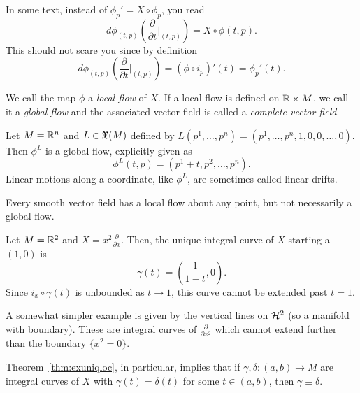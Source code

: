 \begin{remark}
	In some text, instead of $\phi_p' = X\circ\phi_p$, you read
	\begin{equation}
		d\phi_{(t,p)}\left(\frac{\partial}{\partial t}\Big|_{(t,p)}\right) = X \circ \phi(t,p).
	\end{equation}
	This should not scare you since by definition
	\begin{equation}
		d\phi_{(t,p)}\left(\frac{\partial}{\partial t}\Big|_{(t,p)}\right) = (\phi \circ i_p)'(t) = \phi_p'(t).
	\end{equation}
\end{remark}

We call the map $\phi$ a \emph{local flow} of $X$.
If a local flow is defined on $\mathbb{R}\times M$, we call it a \emph{global flow} and the associated vector field is called a \emph{complete vector field}.

\begin{example}\label{example:lineardrift}
	Let $M=\mathbb{R}^n$ and $L\in\mathfrak{X}(M)$ defined by $L(p^1, \ldots, p^n) = (p^1, \ldots, p^n, 1, 0, 0, \ldots, 0)$.
	Then $\phi^L$ is a global flow, explicitly given as
	\begin{equation}
		\phi^L(t,p) = (p^1+t, p^2, \ldots, p^n).
	\end{equation}
	Linear motions along a coordinate, like $\phi^L$, are sometimes called linear drifts.
\end{example}

Every smooth vector field has a local flow about any point, but not necessarily a global flow.
\begin{example}\label{ex:non-complete}
	Let $M = \mathbb{R}^2$ and $X = x^2 \frac{\partial}{\partial x}$.
	Then, the unique integral curve of $X$ starting a $(1,0)$ is
	\begin{equation}
		\gamma(t) = \left(\frac{1}{1-t}, 0\right).
	\end{equation}
	Since $i_x \circ \gamma(t)$ is unbounded as $t\to 1$, this curve cannot be extended past $t=1$.

	A somewhat simpler example is given by the vertical lines on $\mathcal{H}^2$ (so a manifold with boundary). These are integral curves of $\frac{\partial}{\partial x^2}$ which cannot extend further than the boundary $\{x^2=0\}$.
\end{example}

Theorem~\ref{thm:exuniqloc}, in particular, implies that if $\gamma, \delta : (a,b)\to M$ are integral curves of $X$ with $\gamma(t) = \delta(t)$ for some $t \in(a,b)$, then $\gamma\equiv\delta$.

